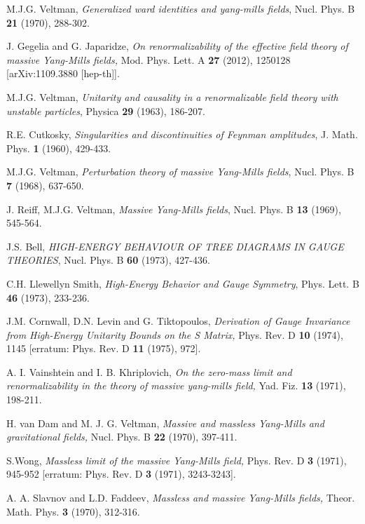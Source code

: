 \documentclass{article}
\begin{document}
\begin{thebibliography}{9}
M.J.G. Veltman, \textit{Generalized ward identities and yang-mills fields}, Nucl. Phys. B \textbf{21} (1970), 288-302.

J. Gegelia and G. Japaridze, \textit{On renormalizability of the effective field theory of massive Yang-Mills fields,} Mod. Phys. Lett. A \textbf{27} (2012), 1250128 [arXiv:1109.3880 [hep-th]].


M.J.G. Veltman, \textit{Unitarity and causality in a renormalizable field theory with unstable particles}, Physica \textbf{29} (1963), 186-207.

 R.E. Cutkosky, \textit{Singularities and discontinuities of Feynman amplitudes}, J. Math. Phys. \textbf{1} (1960), 429-433.
 
 
M.J.G. Veltman, \textit{Perturbation theory of massive Yang-Mills fields}, Nucl. Phys. B \textbf{7} (1968), 637-650.

J. Reiff, M.J.G. Veltman, \textit{Massive Yang-Mills fields}, Nucl. Phys. B \textbf{13} (1969), 545-564.

J.S. Bell, \textit{HIGH-ENERGY BEHAVIOUR OF TREE DIAGRAMS IN GAUGE THEORIES}, Nucl. Phys. B \textbf{60} (1973), 427-436.

C.H. Llewellyn Smith, \textit{High-Energy Behavior and Gauge Symmetry}, Phys. Lett. B \textbf{46} (1973), 233-236.

 J.M. Cornwall, D.N. Levin and G. Tiktopoulos, \textit{Derivation of Gauge Invariance from High-Energy Unitarity Bounds on the S Matrix,} Phys. Rev. D \textbf{10} (1974), 1145
[erratum: Phys. Rev. D \textbf{11} (1975), 972].

A. I. Vainshtein and I. B. Khriplovich, \textit{On the zero-mass limit and renormalizability in the theory of massive yang-mills field,} Yad. Fiz. \textbf{13} (1971), 198-211. 


H. van Dam and M. J. G. Veltman, \textit{Massive and massless Yang-Mills and gravitational fields,} Nucl. Phys. B \textbf{22} (1970), 397-411.


S.Wong, \textit{Massless limit of the massive Yang-Mills field,} Phys. Rev. D \textbf{3} (1971), 945-952
[erratum: Phys. Rev. D \textbf{3} (1971), 3243-3243].
 
A. A. Slavnov and L.D. Faddeev, \textit{Massless and massive Yang-Mills fields,} Theor. Math. Phys. \textbf{3} (1970), 312-316.



\end{thebibliography}
\end{document}
